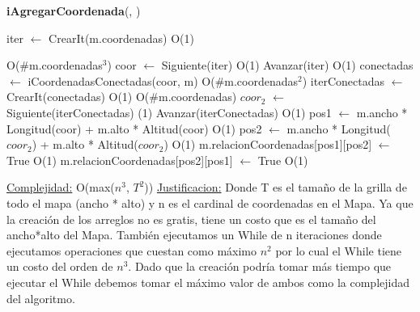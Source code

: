 \begin{Algoritmos}
\begin{algorithm}[H]{\textbf{iAgregarCoordenada}(, )}
\begin{algorithmic}[1]
		\State iter $\gets$ CrearIt(m.coordenadas) \Comment O(1)
		
		 \Comment O($\#$m.coordenadas$^3$)
			\State coor $\gets$ Siguiente(iter) \Comment O(1)
			\State Avanzar(iter) \Comment O(1)
			\State conectadas $\gets$ iCoordenadasConectadas(coor, m) \Comment O($\#$m.coordenadas$^2$)
			\State iterConectadas $\gets$ CrearIt(conectadas) \Comment O(1)
			 \Comment O($\#$m.coordenadas)
				\State $coor_2$ $\gets$ Siguiente(iterConectadas) \Comment(1)
				\State Avanzar(iterConectadas) \Comment O(1)
				\State pos1 $\gets$ m.ancho * Longitud(coor) + m.alto * Altitud(coor) \Comment O(1)
				\State pos2 $\gets$ m.ancho * Longitud($coor_2$) + m.alto * Altitud($coor_2$) \Comment O(1)
				\State m.relacionCoordenadas[pos1][pos2] $\gets$ True \Comment O(1)
				\State m.relacionCoordenadas[pos2][pos1] $\gets$ True \Comment O(1)
			\EndWhile
		\EndWhile
		
		\medskip
		\Statex \underline{Complejidad:} O(max($n^3$, $T^2$))
		\Statex \underline{Justificacion:} Donde T es el tama\~no de la grilla de todo el mapa (ancho * alto) y n es el cardinal de coordenadas en el Mapa. Ya que la creaci\'on de los arreglos no es gratis, tiene un costo que es el tama\~no del ancho*alto del Mapa. Tambi\'en ejecutamos un While de n iteraciones donde ejecutamos operaciones que cuestan como m\'aximo $n^2$ por lo cual el While tiene un costo del orden de $n^3$. Dado que la creaci\'on podr\'ia tomar m\'as tiempo que ejecutar el While debemos tomar el m\'aximo valor de ambos como la complejidad del algoritmo.
	\end{algorithmic}
\end{algorithm}


\end{Algoritmos}

